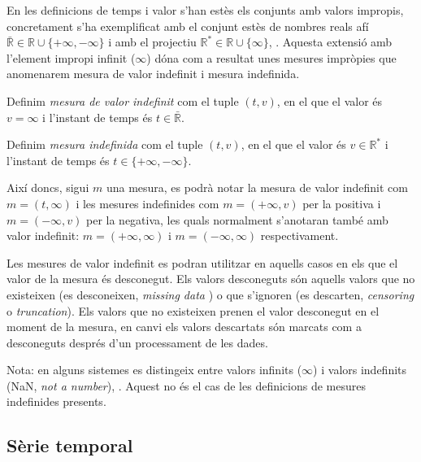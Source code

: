 En les definicions de temps i valor s'han estès els conjunts amb valors impropis, concretament s'ha exemplificat amb el conjunt estès de
nombres reals afí $\bar{\mathbb{R}} \in \mathbb{R} \cup
\{+\infty,-\infty\}$ i amb el projectiu $\mathbb{R}^*\in\mathbb{R} \cup \{\infty\}$, \parencite{cantrell:extendedreal,cantrell:projectivelyextendedreal}. Aquesta extensió amb l'element impropi
infinit ($\infty$) dóna com a resultat unes mesures impròpies que
anomenarem mesura de valor indefinit i mesura indefinida.

\begin{definition}
  \label{def:model:mesura_valor_indefinit}
  Definim \emph{mesura de valor indefinit} com el tuple $(t,v)$, en el
  que el valor és $v=\infty$ i l'instant de temps és
  $t\in\bar{\mathbb{R}}$.
\end{definition}

\begin{definition}
  \label{def:model:mesura_indefinida}
  Definim \emph{mesura indefinida} com el tuple $(t,v)$, en el que el
  valor és $v\in\mathbb{R}^*$ i l'instant de temps és
  $t\in\{+\infty,-\infty\}$.
\end{definition}

Així doncs, sigui $m$ una mesura, es podrà notar la mesura de valor indefinit com  $m=(t,\infty)$ i les mesures indefinides com $m=(+\infty,v)$ per la positiva  i $m=(-\infty,v)$ per la negativa, les quals normalment s'anotaran també amb valor indefinit: $m=(+\infty,\infty)$ i $m=(-\infty,\infty)$ respectivament.


Les mesures de valor indefinit es podran utilitzar en aquells casos en els que el valor de la mesura és desconegut. Els valors desconeguts  són aquells valors que no existeixen (es desconeixen, \emph{missing data} ) o que s'ignoren (es descarten, \emph{censoring} o \emph{truncation}). Els valors que no existeixen prenen el valor desconegut en el moment de la mesura, en canvi els valors descartats són marcats com a desconeguts després d'un processament de les dades. 

Nota: en alguns sistemes es distingeix entre valors infinits ($\infty$) i valors indefinits (NaN, \emph{not a number}), \cite{wiki:ieee754}. Aquest no és el cas de les definicions de mesures indefinides presents.



\subsection{Sèrie temporal}
\label{sec:model:serietemporal}

